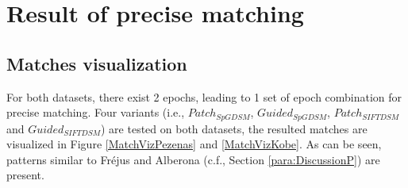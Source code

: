 
\chapter{Result of precise matching}
\label{chap:appendixB}
\section{Matches visualization}
\label{sec:PrecisematchViz}
For both datasets, there exist 2 epochs, leading to 1 set of epoch combination for precise matching. Four variants (i.e.,  $Patch_{SpGDSM}$,  $Guided_{SpGDSM}$,  $Patch_{SIFTDSM}$ and  $Guided_{SIFTDSM}$) are tested on both datasets, the resulted matches are visualized in Figure \ref{MatchVizPezenas} and \ref{MatchVizKobe}. 
As can be seen, patterns similar to Fr{\'e}jus and Alberona (c.f., Section \ref{para:DiscussionP}) are present.%


